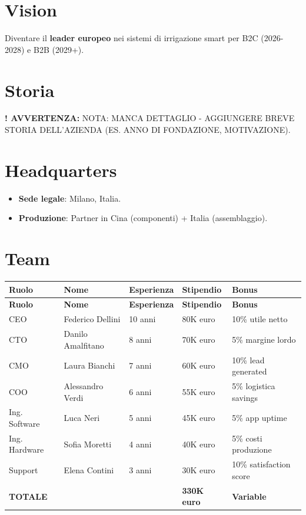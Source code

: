 \documentclass[11pt,a4paper]{report}
\newcommand{\warningtext}{\textbf{! AVVERTENZA: }}
\begin{document}
\section{Vision}
Diventare il {\bf leader europeo} nei sistemi di irrigazione smart per B2C (2026-2028) e B2B (2029+).

\section{Storia}
\warningtext NOTA: MANCA DETTAGLIO - AGGIUNGERE BREVE STORIA DELL'AZIENDA (ES. ANNO DI FONDAZIONE, MOTIVAZIONE).

\section{Headquarters}
\begin{itemize}
\item {\bf Sede legale}: Milano, Italia.
\item {\bf Produzione}: Partner in Cina (componenti) + Italia (assemblaggio).
\end{itemize}

\section{Team}
\begin{longtable}{|L{2cm}|L{2.5cm}|L{2.5cm}|C{1.4cm}|L{2cm}|}
\hline
{\bf Ruolo} & {\bf Nome} & {\bf Esperienza} & {\bf Stipendio} & {\bf Bonus} \\
\hline
\endfirsthead
\hline
{\bf Ruolo} & {\bf Nome} & {\bf Esperienza} & {\bf Stipendio} & {\bf Bonus} \\
\hline
\endhead
\endfoot
\endlastfoot
CEO & Federico Dellini & 10 anni & 80K euro & 10\% utile netto \\
CTO & Danilo Amalfitano & 8 anni & 70K euro & 5\% margine lordo \\
CMO & Laura Bianchi & 7 anni & 60K euro & 10\% lead generated \\
COO & Alessandro Verdi & 6 anni & 55K euro & 5\% logistica savings \\
Ing. Software & Luca Neri & 5 anni & 45K euro & 5\% app uptime \\
Ing. Hardware & Sofia Moretti & 4 anni & 40K euro & 5\% costi produzione \\
Support & Elena Contini & 3 anni & 30K euro & 10\% satisfaction score \\
\hline
{\bf TOTALE} & & & {\bf 330K euro} & {\bf Variable} \\
\hline
\end{longtable}
\end{document}
